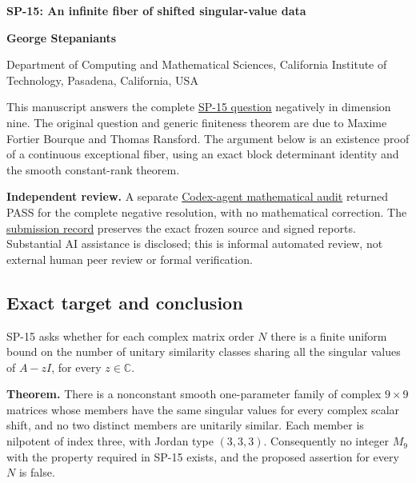\documentclass[10pt,a4paper]{article}
\begin{document}
{\raggedright\Large\bfseries SP-15: An infinite fiber of shifted
singular-value data\par}
\vspace{0.4em}
{\normalsize\bfseries George Stepaniants\par}
{\small Department of Computing and Mathematical Sciences, California
Institute of Technology, Pasadena, California, USA\par}
\vspace{0.6em}
This manuscript answers the complete
\href{https://github.com/ajt60gaibb/OpenProblemsInNLA/blob/main/eigenvalues-and-inverse-problems/SP-15/README.md}{SP-15
question} negatively in dimension nine. The original question and
generic finiteness theorem are due to Maxime Fortier Bourque and Thomas
Ransford. The argument below is an existence proof of a continuous
exceptional fiber, using an exact block determinant identity and the
smooth constant-rank theorem.

\textbf{Independent review.} A separate
\href{https://github.com/ajt60gaibb/OpenProblemsInNLA/blob/main/references/stepaniants-sp15-2026-09-12/verification/independent-review-aa01/review.md}{Codex-agent
mathematical audit} returned PASS for the complete negative resolution,
with no mathematical correction. The
\href{https://github.com/ajt60gaibb/OpenProblemsInNLA/blob/main/references/stepaniants-sp15-2026-09-12/README.md}{submission
record} preserves the exact frozen source and signed reports.
Substantial AI assistance is disclosed; this is informal automated
review, not external human peer review or formal verification.

\subsection{Exact target and
conclusion}\label{exact-target-and-conclusion}

SP-15 asks whether for each complex matrix order \(N\) there is a finite
uniform bound on the number of unitary similarity classes sharing all
the singular values of \(A-zI\), for every \(z\in\mathbb C\).

\textbf{Theorem.} There is a nonconstant smooth one-parameter family of
complex \(9\times9\) matrices whose members have the same singular
values for every complex scalar shift, and no two distinct members are
unitarily similar. Each member is nilpotent of index three, with Jordan
type \((3,3,3)\). Consequently no integer \(M_9\) with the property
required in SP-15 exists, and the proposed assertion for every \(N\) is
false.
\end{document}
